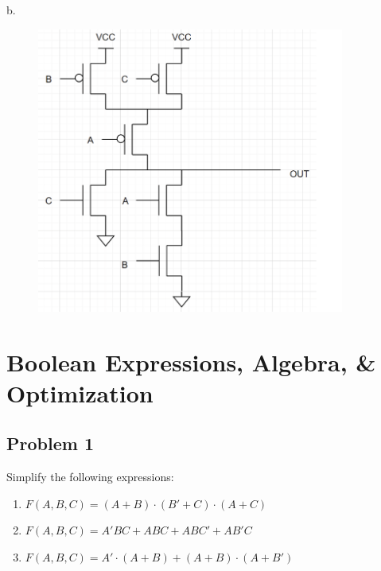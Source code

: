 \documentclass{article}
\begin{document}
b.
\begin{figure}[!h]
        \centering
        \includegraphics[width=0.9\textwidth]{figures/CMOS_2b.png}
\end{figure}

\newpage
\section*{Boolean Expressions, Algebra, \& Optimization}
\subsection*{Problem 1}
Simplify the following expressions:
\begin{enumerate}[label=\alph*.]
    \item $ F(A,B,C) = (A + B) \cdot (B' + C) \cdot (A + C)$
    \item $ F(A,B,C) = A'BC + ABC + ABC' + AB'C$
    \item $ F(A,B,C) = A' \cdot (A + B) + (A + B) \cdot (A + B')$
\end{enumerate}
\end{document}
